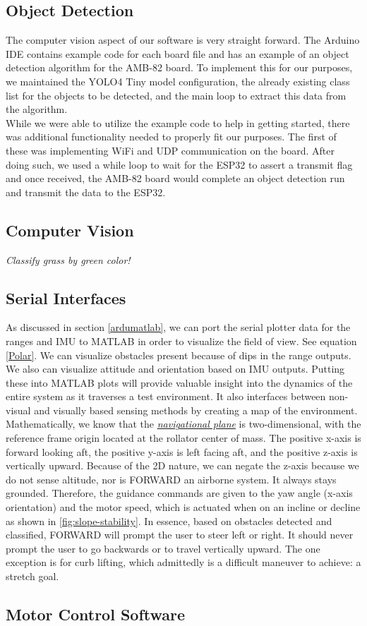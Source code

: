 \subsection{Object Detection}
\noindent The computer vision aspect of our software is very straight forward. The Arduino IDE contains example code for each board file and has an example of an object detection algorithm for the AMB-82 board. To implement this for our purposes, we maintained the YOLO4 Tiny model configuration, the already existing class list for the objects to be detected, and the main loop to extract this data from the algorithm. \\

\noindent While we were able to utilize the example code to help in getting started, there was additional functionality needed to properly fit our purposes. The first of these was implementing WiFi and UDP communication on the board. After doing such, we used a while loop to wait for the ESP32 to assert a transmit flag and once received, the AMB-82 board would complete an object detection run and transmit the data to the ESP32. \\

\subsection{Computer Vision}
\noindent \textit{Classify grass by green color!}


\subsection{Serial Interfaces}
\noindent As discussed in section \ref{ardumatlab}, we can port the serial plotter data for the ranges and IMU to MATLAB in order to visualize the field of view. See equation \ref{Polar}. We can visualize obstacles present because of dips in the range outputs. We also can visualize attitude and orientation based on IMU outputs. Putting these into MATLAB plots will provide valuable insight into the dynamics of the entire system as it traverses a test environment. It also interfaces between non-visual and visually based sensing methods by creating a map of the environment.\\

\noindent Mathematically, we know that the \underline{\textit{navigational plane}} is two-dimensional, with the reference frame origin located at the rollator center of mass. The positive x-axis is forward looking aft, the positive y-axis is left facing aft, and the positive z-axis is vertically upward. Because of the 2D nature, we can negate the z-axis because we do not sense altitude, nor is FORWARD an airborne system. It always stays grounded. Therefore, the guidance commands are given to the yaw angle (x-axis orientation) and the motor speed, which is actuated when on an incline or decline as shown in \ref{fig:slope-stability}. In essence, based on obstacles detected and classified, FORWARD will prompt the user to steer left or right. It should never prompt the user to go backwards or to travel vertically upward. The one exception is for curb lifting, which admittedly is a difficult maneuver to achieve: a stretch goal.\\

\subsection{Motor Control Software}


\\